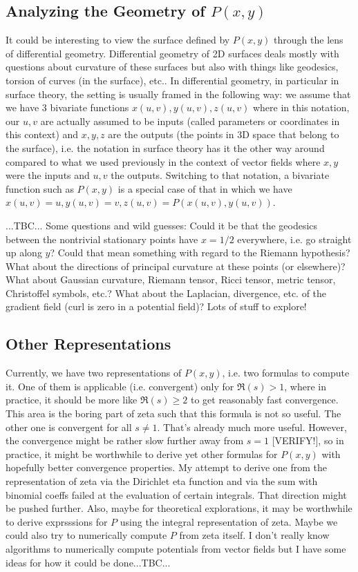 \documentclass[12pt]{article}
\begin{document}
\subsection{Analyzing the Geometry of $P(x,y)$}
It could be interesting to view the surface defined by $P(x,y)$ through the lens of differential geometry. Differential geometry of 2D surfaces deals mostly with questions about curvature of these surfaces but also with things like geodesics, torsion of curves (in the surface), etc.. In differential geometry, in particular in surface theory, the setting is usually framed in the following way: we assume that we have 3 bivariate functions $x(u,v), y(u,v), z(u,v)$ where in this notation, our $u,v$ are actually assumed to be inputs (called parameters or coordinates in this context) and $x,y,z$ are the outputs (the points in 3D space that belong to the surface), i.e. the notation in surface theory has it the other way around compared to what we used previously in the context of vector fields where $x,y$ were the inputs and $u,v$ the outputs. Switching to that notation, a bivariate function such as $P(x,y)$ is a special case of that in which we have $x(u,v) = u, y(u,v) = v, z(u,v) = P(x(u,v),y(u,v))$.

...TBC... Some questions and wild guesses: Could it be that the geodesics between the nontrivial stationary points have $x=1/2$ everywhere, i.e. go straight up along $y$? Could that mean something with regard to the Riemann hypothesis? What about the directions of principal curvature at these points (or elsewhere)? What about Gaussian curvature, Riemann tensor, Ricci tensor, metric tensor, Christoffel symbols, etc.? What about the Laplacian, divergence, etc. of the gradient field (curl is zero in a potential field)? Lots of stuff to explore!

\subsection{Other Representations}
Currently, we have two representations of $P(x,y)$, i.e. two formulas to compute it. One of them is applicable (i.e. convergent) only for $\Re(s) > 1$, where in practice, it should be more like $\Re(s) \geq 2$ to get reasonably fast convergence. This area is the boring part of zeta such that this formula is not so useful. The other one is convergent for all $s \neq 1$. That's already much more useful. However, the convergence might be rather slow further away from $s=1$ [VERIFY!], so in practice, it might be worthwhile to derive yet other formulas for $P(x,y)$ with hopefully better convergence properties. My attempt to derive one from the representation of zeta via the Dirichlet eta function and via the sum with binomial coeffs failed at the evaluation of certain integrals. That direction might be pushed further. Also, maybe for theoretical explorations, it may be worthwhile to derive exprsssions for $P$ using the integral representation of zeta. Maybe we could also try to numerically compute $P$ from zeta itself. I don't really know algorithms to numerically compute potentials from vector fields but I have some ideas for how it could be done...TBC...
\end{document}
